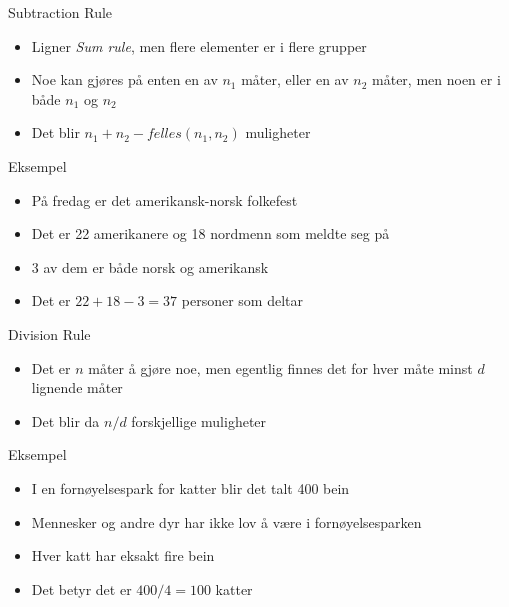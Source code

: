 \begin{frame}
\begin{block}{Subtraction Rule}
\begin{itemize}
\item Ligner \textit{Sum rule}, men flere elementer er i flere grupper
\item Noe kan gjøres på enten en av $n_1$ måter, eller en av $n_2$ måter, men noen er i både $n_1$ og $n_2$
\item Det blir $n_1+n_2-felles(n_1,n_2)$ muligheter
\end{itemize}
\end{block}
\pause
\begin{block}{Eksempel}
\begin{itemize}
\item På fredag er det amerikansk-norsk folkefest
\item Det er 22 amerikanere og 18 nordmenn som meldte seg på
\item 3 av dem er både norsk og amerikansk
\item Det er $22+18-3=37$ personer som deltar
\end{itemize}
\end{block}
\end{frame}

\begin{frame}
\begin{block}{Division Rule}
\begin{itemize}
\item Det er $n$ måter å gjøre noe, men egentlig finnes det for hver måte minst $d$ lignende måter
\item Det blir da $n/d$ forskjellige muligheter
\end{itemize}
\end{block}
\pause
\begin{block}{Eksempel}
\begin{itemize}
\item I en fornøyelsespark for katter blir det talt 400 bein \item Mennesker og andre dyr har ikke lov å være i fornøyelsesparken
\item Hver katt har eksakt fire bein
\item Det betyr det er $400/4=100$ katter
\end{itemize}
\end{block}
\end{frame}

